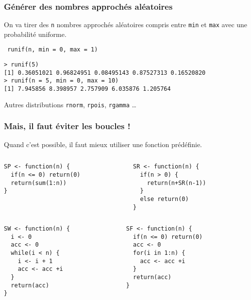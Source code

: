 \documentclass[10pt]{beamer}
\begin{document}
\begin{frame}[fragile]
  \frametitle{  Générer des nombres approchés aléatoires}
  On va tirer des \texttt{n} nombres approchés aléatoires compris entre \texttt{min} et \texttt{max} avec une probabilité uniforme.
  \begin{center}
    \alert{\texttt{ runif(n, min = 0, max = 1)}}
  \end{center}

    \begin{lstlisting}
> runif(5)
[1] 0.36051021 0.96824951 0.08495143 0.87527313 0.16520820
> runif(n = 5, min = 0, max = 10)
[1] 7.945856 8.398957 2.757909 6.035876 1.205764
\end{lstlisting}


\begin{block}{Autres distributions}
  \texttt{rnorm}, \texttt{rpois}, \texttt{rgamma} \dots
\end{block}
\end{frame}


\begin{frame}[fragile]
  \frametitle{Mais, il faut éviter les boucles !}
  \begin{center}
    \alert{Quand c’est possible, il faut mieux utiliser une fonction prédéfinie.}
  \end{center}

\begin{columns}[t]
\begin{column}{0.48\textwidth}
  \begin{lstlisting}[style=editor]
SP <- function(n) {
  if(n <= 0) return(0)
  return(sum(1:n))
}
\end{lstlisting}
\end{column}
\begin{column}{0.48\textwidth}
  \begin{lstlisting}[style=editor]
SR <- function(n) {
  if(n > 0) {
    return(n+SR(n-1))
  }
  else return(0)
}
  \end{lstlisting}
\end{column}
\end{columns}

\begin{columns}[t]
\begin{column}{0.48\textwidth}
  \begin{lstlisting}[style=editor]
SW <- function(n) {
  i <- 0
  acc <- 0
  while(i < n) {
    i <- i + 1
    acc <- acc +i
  }
  return(acc)
}
\end{lstlisting}
\end{column}
\begin{column}{0.48\textwidth}
  \begin{lstlisting}[style=editor]
SF <- function(n) {
  if(n <= 0) return(0)
  acc <- 0
  for(i in 1:n) {
    acc <- acc +i
  }
  return(acc)
}
\end{lstlisting}
\end{column}
\end{columns}

\end{frame}
\end{document}
